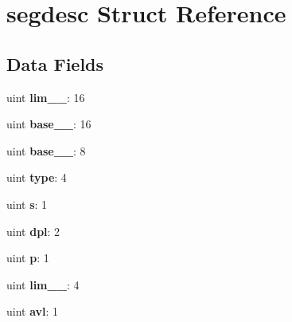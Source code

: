 \hypertarget{structsegdesc}{}\section{segdesc Struct Reference}
\label{structsegdesc}
\subsection*{Data Fields}
\begin{DoxyCompactItemize}
\item 
uint {\bfseries lim\+\_\+\_}\+: 16\hypertarget{structsegdesc_a021002a4cf151893b5b8034b09cc7530}{}\label{structsegdesc_a021002a4cf151893b5b8034b09cc7530}

\item 
uint {\bfseries base\+\_\+\_}\+: 16\hypertarget{structsegdesc_aaf95dd5b9105cf5729de49eb2542072a}{}\label{structsegdesc_aaf95dd5b9105cf5729de49eb2542072a}

\item 
uint {\bfseries base\+\_\+\_}\+: 8\hypertarget{structsegdesc_aa5cff1f1ddfac386e2268108c8f5b6c2}{}\label{structsegdesc_aa5cff1f1ddfac386e2268108c8f5b6c2}

\item 
uint {\bfseries type}\+: 4\hypertarget{structsegdesc_acb54ea5ee6d09cfcc8b4dd3e96e4ce5b}{}\label{structsegdesc_acb54ea5ee6d09cfcc8b4dd3e96e4ce5b}

\item 
uint {\bfseries s}\+: 1\hypertarget{structsegdesc_aacc67bb0857f0c77c1f8a5c9b8a1ac09}{}\label{structsegdesc_aacc67bb0857f0c77c1f8a5c9b8a1ac09}

\item 
uint {\bfseries dpl}\+: 2\hypertarget{structsegdesc_ab22349cefd6990e4a9a1d93e42ee0c03}{}\label{structsegdesc_ab22349cefd6990e4a9a1d93e42ee0c03}

\item 
uint {\bfseries p}\+: 1\hypertarget{structsegdesc_a322a34a84a3815d35ebb3aa50c5a55e2}{}\label{structsegdesc_a322a34a84a3815d35ebb3aa50c5a55e2}

\item 
uint {\bfseries lim\+\_\+\_}\+: 4\hypertarget{structsegdesc_abbc27a39a2ad6e59faa2eca33d7dfa0c}{}\label{structsegdesc_abbc27a39a2ad6e59faa2eca33d7dfa0c}

\item 
uint {\bfseries avl}\+: 1\hypertarget{structsegdesc_a6623d25de54a0a87d7a43ea4dfe7783f}{}\label{structsegdesc_a6623d25de54a0a87d7a43ea4dfe7783f}


\end{DoxyCompactItemize}
